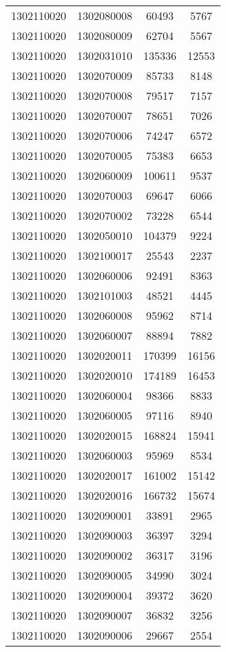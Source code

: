 \begin{longtable}[h]{llcc}
		1302110020 & 1302080008 & 60493 & 5767\\
		1302110020 & 1302080009 & 62704 & 5567\\
		1302110020 & 1302031010 & 135336 & 12553\\
		1302110020 & 1302070009 & 85733 & 8148\\
		1302110020 & 1302070008 & 79517 & 7157\\
		1302110020 & 1302070007 & 78651 & 7026\\
		1302110020 & 1302070006 & 74247 & 6572\\
		1302110020 & 1302070005 & 75383 & 6653\\
		1302110020 & 1302060009 & 100611 & 9537\\
		1302110020 & 1302070003 & 69647 & 6066\\
		1302110020 & 1302070002 & 73228 & 6544\\
		1302110020 & 1302050010 & 104379 & 9224\\
		1302110020 & 1302100017 & 25543 & 2237\\
		1302110020 & 1302060006 & 92491 & 8363\\
		1302110020 & 1302101003 & 48521 & 4445\\
		1302110020 & 1302060008 & 95962 & 8714\\
		1302110020 & 1302060007 & 88894 & 7882\\
		1302110020 & 1302020011 & 170399 & 16156\\
		1302110020 & 1302020010 & 174189 & 16453\\
		1302110020 & 1302060004 & 98366 & 8833\\
		1302110020 & 1302060005 & 97116 & 8940\\
		1302110020 & 1302020015 & 168824 & 15941\\
		1302110020 & 1302060003 & 95969 & 8534\\
		1302110020 & 1302020017 & 161002 & 15142\\
		1302110020 & 1302020016 & 166732 & 15674\\
		1302110020 & 1302090001 & 33891 & 2965\\
		1302110020 & 1302090003 & 36397 & 3294\\
		1302110020 & 1302090002 & 36317 & 3196\\
		1302110020 & 1302090005 & 34990 & 3024\\
		1302110020 & 1302090004 & 39372 & 3620\\
		1302110020 & 1302090007 & 36832 & 3256\\
		1302110020 & 1302090006 & 29667 & 2554\\

\end{longtable}
